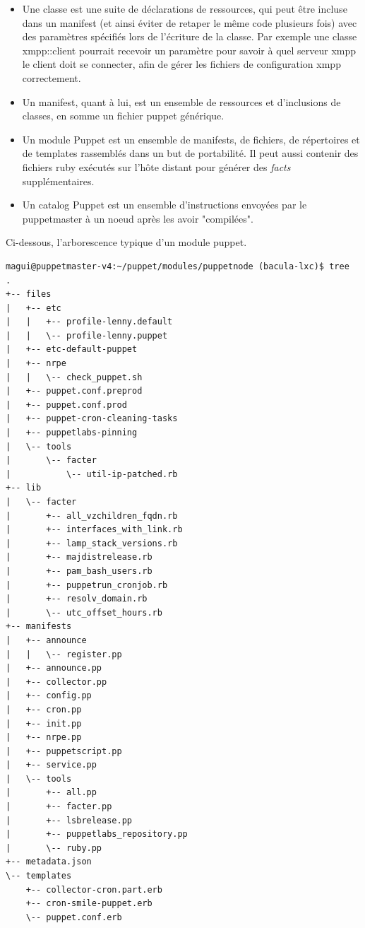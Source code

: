 \documentclass[14 pt]{extreport}
\begin{document}
\begin{itemize}
	\item Une classe est une suite de déclarations de ressources, qui peut être incluse dans un manifest (et ainsi éviter de retaper le même code plusieurs fois) avec des paramètres spécifiés lors de l'écriture de la classe. Par exemple une classe xmpp::client pourrait recevoir un paramètre pour savoir à quel serveur xmpp le client doit se connecter, afin de gérer les fichiers de configuration xmpp correctement.
	\item Un manifest, quant à lui, est un ensemble de ressources et d'inclusions de classes, en somme un fichier puppet générique.
	\item Un module Puppet est un ensemble de manifests, de fichiers, de répertoires et de templates rassemblés dans un but de portabilité. Il peut aussi contenir des fichiers ruby exécutés sur l'hôte distant pour générer des \emph{facts} supplémentaires.
	\item Un catalog Puppet est un ensemble d'instructions envoyées par le puppetmaster à un noeud après les avoir "compilées".
\end{itemize}

Ci-dessous, l'arborescence typique d'un module puppet.
\newpage
\begin{Verbatim}[fontsize=\tiny]
magui@puppetmaster-v4:~/puppet/modules/puppetnode (bacula-lxc)$ tree
.
+-- files
|   +-- etc
|   |   +-- profile-lenny.default
|   |   \-- profile-lenny.puppet
|   +-- etc-default-puppet
|   +-- nrpe
|   |   \-- check_puppet.sh
|   +-- puppet.conf.preprod
|   +-- puppet.conf.prod
|   +-- puppet-cron-cleaning-tasks
|   +-- puppetlabs-pinning
|   \-- tools
|       \-- facter
|           \-- util-ip-patched.rb
+-- lib
|   \-- facter
|       +-- all_vzchildren_fqdn.rb
|       +-- interfaces_with_link.rb
|       +-- lamp_stack_versions.rb
|       +-- majdistrelease.rb
|       +-- pam_bash_users.rb
|       +-- puppetrun_cronjob.rb
|       +-- resolv_domain.rb
|       \-- utc_offset_hours.rb
+-- manifests
|   +-- announce
|   |   \-- register.pp
|   +-- announce.pp
|   +-- collector.pp
|   +-- config.pp
|   +-- cron.pp
|   +-- init.pp
|   +-- nrpe.pp
|   +-- puppetscript.pp
|   +-- service.pp
|   \-- tools
|       +-- all.pp
|       +-- facter.pp
|       +-- lsbrelease.pp
|       +-- puppetlabs_repository.pp
|       \-- ruby.pp
+-- metadata.json
\-- templates
    +-- collector-cron.part.erb
    +-- cron-smile-puppet.erb
    \-- puppet.conf.erb

\end{Verbatim}
\end{document}
